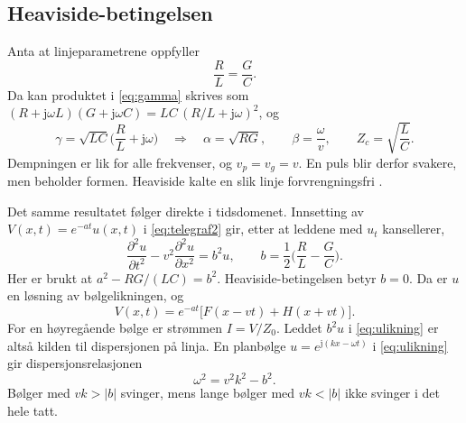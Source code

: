 \documentclass[11pt,a4paper]{article}
\numberwithin{equation}{section}
\numberwithin{figure}{section}
\numberwithin{table}{section}
\newcommand{\jj}{\mathrm{j}}
\newcommand{\pdd}[2]{\frac{\partial^2 #1}{\partial #2^2}}
\begin{document}
\subsection{Heaviside-betingelsen}\label{sec:heaviside}
Anta at linjeparametrene oppfyller
\begin{equation}
  \frac{R}{L} = \frac{G}{C}. \label{eq:heaviside}
\end{equation}
Da kan produktet i \eqref{eq:gamma} skrives som
$(R + \jj\omega L)(G + \jj\omega C) = LC\,(R/L + \jj\omega)^2$, og
\begin{equation}
  \gamma = \sqrt{LC}\Big(\frac{R}{L} + \jj\omega\Big)
  \quad\Rightarrow\quad
  \alpha = \sqrt{RG}, \qquad \beta = \frac{\omega}{v}, \qquad Z_c = \sqrt{\frac{L}{C}}.
\end{equation}
Dempningen er lik for alle frekvenser, og $v_p = v_g = v$. En puls blir derfor
svakere, men beholder formen. Heaviside kalte en slik linje forvrengningsfri
\cite{heaviside1893}.

Det samme resultatet følger direkte i tidsdomenet. Innsetting av
$V(x,t) = e^{-at}u(x,t)$ i \eqref{eq:telegraf2} gir, etter at leddene med $u_t$
kansellerer,
\begin{equation}
  \pdd{u}{t} - v^2\pdd{u}{x} = b^2 u, \qquad b = \frac12\Big(\frac{R}{L} - \frac{G}{C}\Big). \label{eq:ulikning}
\end{equation}
Her er brukt at $a^2 - RG/(LC) = b^2$. Heaviside-betingelsen betyr $b = 0$. Da er
$u$ en løsning av bølgelikningen, og
\begin{equation}
  V(x,t) = e^{-at}\big[F(x - vt) + H(x + vt)\big]. \label{eq:heavisideloesning}
\end{equation}
For en høyregående bølge er strømmen $I = V/Z_0$. Leddet $b^2u$ i
\eqref{eq:ulikning} er altså kilden til dispersjonen på linja. En planbølge
$u = e^{\jj(kx - \omega t)}$ i \eqref{eq:ulikning} gir dispersjonsrelasjonen
\begin{equation}
  \omega^2 = v^2k^2 - b^2. \label{eq:tidsdispersjon}
\end{equation}
Bølger med $vk > |b|$ svinger, mens lange bølger med $vk < |b|$ ikke svinger
i det hele tatt.
\end{document}
